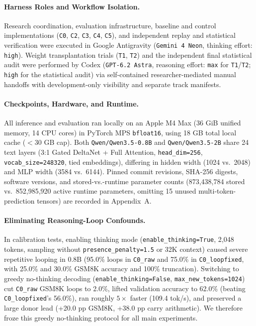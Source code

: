 \documentclass[11pt]{article}
\newcommand{\codepath}[1]{\texttt{\nolinkurl{#1}}}
\begin{document}
\paragraph{Harness Roles and Workflow Isolation.}
Research coordination, evaluation infrastructure, baseline and control implementations (\texttt{C0}, \texttt{C2}, \texttt{C3}, \texttt{C4}, \texttt{C5}), and independent replay and statistical verification were executed in Google Antigravity (\texttt{Gemini 4 Neon}, thinking effort: \texttt{high}). Weight transplantation trials (\texttt{T1}, \texttt{T2}) and the independent final statistical audit were performed by Codex (\texttt{GPT-6.2 Astra}, reasoning effort: \texttt{max} for \texttt{T1}/\texttt{T2}; \texttt{high} for the statistical audit) via self-contained researcher-mediated manual handoffs with development-only visibility and separate track manifests.

\paragraph{Checkpoints, Hardware, and Runtime.}
All inference and evaluation ran locally on an Apple M4 Max (36 GiB unified memory, 14 CPU cores) in PyTorch MPS \texttt{bfloat16}, using 18 GB total local cache ($< 30$ GB cap). Both \codepath{Qwen/Qwen3.5-0.8B} and \codepath{Qwen/Qwen3.5-2B} share 24 text layers (3:1 Gated DeltaNet + Full Attention, \texttt{head\_dim=256}, \texttt{vocab\_size=248320}, tied embeddings), differing in hidden width (1024 vs.\ 2048) and MLP width (3584 vs.\ 6144). Pinned commit revisions, SHA-256 digests, software versions, and stored-vs.-runtime parameter counts (873,438,784 stored vs.\ 852,985,920 active runtime parameters, omitting 15 unused multi-token-prediction tensors) are recorded in Appendix~A.

\paragraph{Eliminating Reasoning-Loop Confounds.}
In calibration tests, enabling thinking mode (\texttt{enable\_thinking=True}, 2,048 tokens, sampling without \texttt{presence\_penalty=1.5} or 32K context) caused severe repetitive looping in 0.8B (95.0\% loops in \texttt{C0\_raw} and 75.0\% in \texttt{C0\_loopfixed}, with 25.0\% and 30.0\% GSM8K accuracy and 100\% truncation). Switching to greedy no-thinking decoding (\texttt{enable\_thinking=False}, \texttt{max\_new\_tokens=1024}) cut \texttt{C0\_raw} GSM8K loops to 2.0\%, lifted validation accuracy to 62.0\% (beating \texttt{C0\_loopfixed}'s 56.0\%), ran roughly $5\times$ faster (109.4 tok/s), and preserved a large donor lead (+20.0 pp GSM8K, +38.0 pp carry arithmetic). We therefore froze this greedy no-thinking protocol for all main experiments.
\end{document}
